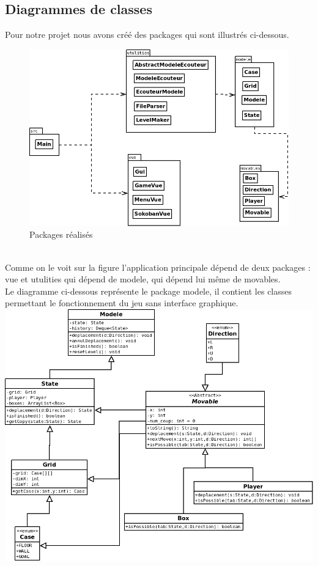 \documentclass[a4paper,12pt]{article} %
\begin{document}
\subsection{Diagrammes de classes}
Pour notre projet nous avons créé des packages qui sont illustrés ci-dessous.
\begin{figure}[!h]
\includegraphics[scale=0.5]{Diagramme1.png}
\caption{Packages réalisés}
\end{figure}\\
Comme on le voit sur la figure l'application principale dépend de deux packages : vue et utulities qui dépend de modele, qui dépend lui même de movables.\\
Le diagramme ci-dessous représente le package modele, il contient les classes permettant le fonctionnement du jeu sans interface graphique.\\
\includegraphics[scale=0.5]{Diagramme3.png}\\
\end{document}
